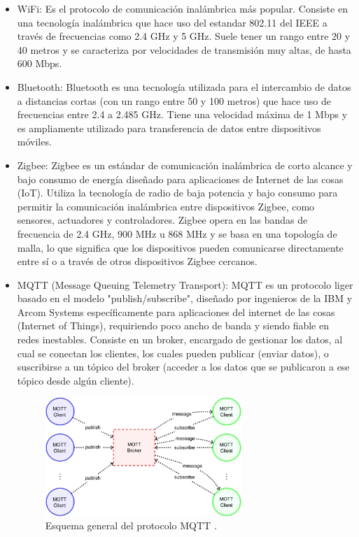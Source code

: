\begin{itemize}
    \item WiFi: Es el protocolo de comunicación inalámbrica más popular. Consiste en una tecnología inalámbrica que hace uso del estandar 802.11 del IEEE a través de frecuencias como 2.4 GHz y 5 GHz. Suele tener un rango entre 20 y 40 metros y se caracteriza por velocidades de transmisión muy altas, de hasta 600 Mbps.
    
    \item Bluetooth: Bluetooth es una tecnología utilizada para el intercambio de datos a distancias cortas (con un rango entre 50 y 100 metros) que hace uso de frecuencias entre 2.4 a 2.485 GHz. Tiene una velocidad máxima de 1 Mbps y es ampliamente utilizado para transferencia de datos entre dispositivos móviles.
    
    \item Zigbee: Zigbee es un estándar de comunicación inalámbrica de corto alcance y bajo consumo de energía diseñado para aplicaciones de Internet de las cosas (IoT). Utiliza la tecnología de radio de baja potencia y bajo consumo para permitir la comunicación inalámbrica entre dispositivos Zigbee, como sensores, actuadores y controladores. Zigbee opera en las bandas de frecuencia de 2.4 GHz, 900 MHz u 868 MHz y se basa en una topología de malla, lo que significa que los dispositivos pueden comunicarse directamente entre sí o a través de otros dispositivos Zigbee cercanos. 
    
    \item MQTT (Message Queuing Telemetry Transport): MQTT es un protocolo liger basado en el modelo "publish/subscribe", diseñado por ingenieros de la IBM y Arcom Systems específicamente para aplicaciones del internet de las cosas (Internet of Things), requiriendo poco ancho de banda y siendo fiable en redes inestables. Consiste en un broker, encargado de gestionar los datos, al cual se conectan los clientes, los cuales pueden publicar (enviar datos), o suscribirse a un tópico del broker (acceder a los datos que se publicaron a ese tópico desde algún cliente).
    
    \begin{figure}[H]
        \centering
        \includegraphics[width = 0.7\textwidth]{imagenes/cap1_marcoteo/MQTT-protocol-model.png}
        \caption{Esquema general del protocolo MQTT \citep{aloufi2020hybrid}.}
        \label{fig:mqtt}
    \end{figure}
    
\end{itemize}

